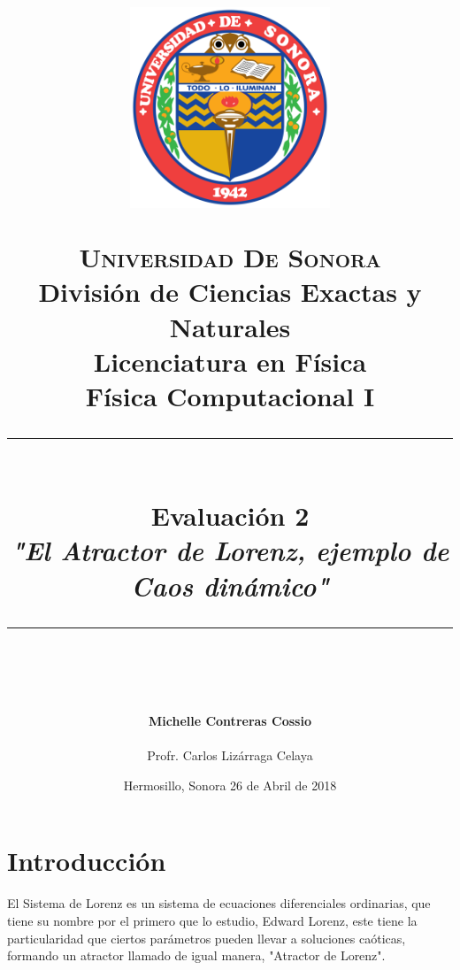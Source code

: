 \documentclass[12pt]{article}
\newcommand{\HRule}[1]{\rule{\linewidth}{#1}}
\begin{document}
\begin{titlepage}

\title{ \normalsize 
        \begin{center}
        \includegraphics[height=6cm]{logo.png}
        \end{center}
        \LARGE \textsc{\textbf{Universidad De Sonora}} \\ \bigskip
		\Large División de Ciencias Exactas y Naturales \\
        Licenciatura en Física \\ \bigskip
        \bigskip
        Física Computacional I
		\\ [0.1cm]  
		\HRule{2pt} \\
		\Large \textbf{{Evaluación 2}} \\
        \textit{\textbf{"El Atractor de Lorenz, ejemplo de Caos dinámico"}}
		\HRule{2pt} \\
		\normalsize \vspace*{0.001\baselineskip}}
        
\date{\bigskip \Large Hermosillo, Sonora  \hspace*{\fill}  26 de Abril de 2018}

        
\author{
		\Large\textbf{ Michelle Contreras Cossio} \\ \bigskip
        \\ \bigskip
       \Large Profr. Carlos Lizárraga Celaya}
       \end{titlepage}
       \maketitle
       

\newpage
\pagestyle{plain}

\section{Introducción}
El Sistema de Lorenz es un sistema de ecuaciones diferenciales ordinarias, que tiene su nombre por el primero que lo estudio, Edward Lorenz, este tiene la particularidad que ciertos parámetros pueden llevar a soluciones caóticas, formando un atractor llamado de igual manera, "Atractor de Lorenz".\\
\end{document}
